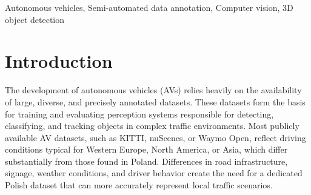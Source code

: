 \documentclass[conference]{IEEEtran}
\begin{document}
\maketitle

\begin{abstract}
This report presents the design and implementation of a semi-automated data annotation pipeline developed within the DARTS project, whose goal is to create a large-scale, multimodal dataset of driving scenarios recorded in Polish conditions. Manual annotation of such heterogeneous data is both costly and time-consuming. To address this challenge, the proposed solution adopts a human-in-the-loop approach that combines artificial intelligence with human expertise to reduce annotation cost and duration. The system automatically generates initial annotations, enables iterative model retraining, and incorporates data anonymization and domain adaptation techniques. At its core, the tool relies on 3D object detection algorithms to produce preliminary annotations. Overall, the developed tools and methodology result in substantial time savings while ensuring consistent, high-quality annotations across different sensor modalities. The solution directly supports the DARTS project by accelerating the preparation of large annotated dataset in the project’s standardized format, strengthening the technological base for autonomous vehicle research in Poland.
\end{abstract}

\begin{IEEEkeywords}
Autonomous vehicles, Semi-automated data annotation, Computer vision, 3D object detection
\end{IEEEkeywords}

\section{Introduction}
The development of autonomous vehicles (AVs) relies heavily on the availability of large, diverse, and precisely annotated datasets. These datasets form the basis for training and evaluating perception systems responsible for detecting, classifying, and tracking objects in complex traffic environments. Most publicly available AV datasets, such as KITTI\cite{b1}, nuScenes\cite{b2}, or Waymo Open\cite{b3}, reflect driving conditions typical for Western Europe, North America, or Asia, which differ substantially from those found in Poland. Differences in road infrastructure, signage, weather conditions, and driver behavior create the need for a dedicated Polish dataset that can more accurately represent local traffic scenarios.
\end{document}
